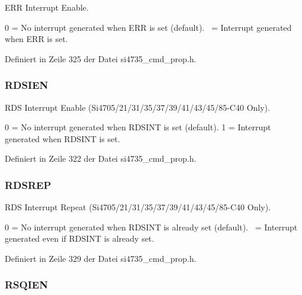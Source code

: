 E\+R\+R Interrupt Enable. 

0 = No interrupt generated when E\+R\+R is set (default).~ = Interrupt generated when E\+R\+R is set. 

Definiert in Zeile 325 der Datei si4735\+\_\+cmd\+\_\+prop.\+h.

\hypertarget{uniongpo__ien_ae79eafa6dcf4c70810372eee4930d5bc}{}
\subsubsection[{R\+D\+S\+I\+E\+N}]{\setlength{\rightskip}{0pt plus 5cm}R\+D\+S\+I\+E\+N}\label{uniongpo__ien_ae79eafa6dcf4c70810372eee4930d5bc}


R\+D\+S Interrupt Enable (Si4705/21/31/35/37/39/41/43/45/85-\/\+C40 Only). 

0 = No interrupt generated when R\+D\+S\+I\+N\+T is set (default). 1 = Interrupt generated when R\+D\+S\+I\+N\+T is set. 

Definiert in Zeile 322 der Datei si4735\+\_\+cmd\+\_\+prop.\+h.

\hypertarget{uniongpo__ien_ab3e7ebd5f6d308aa08db65fae6cd5ebe}{}
\subsubsection[{R\+D\+S\+R\+E\+P}]{\setlength{\rightskip}{0pt plus 5cm}R\+D\+S\+R\+E\+P}\label{uniongpo__ien_ab3e7ebd5f6d308aa08db65fae6cd5ebe}


R\+D\+S Interrupt Repeat (Si4705/21/31/35/37/39/41/43/45/85-\/\+C40 Only). 

0 = No interrupt generated when R\+D\+S\+I\+N\+T is already set (default).~ = Interrupt generated even if R\+D\+S\+I\+N\+T is already set. 

Definiert in Zeile 329 der Datei si4735\+\_\+cmd\+\_\+prop.\+h.

\hypertarget{uniongpo__ien_a3f5edb9c295e1e92b34232c9f3a6cfa1}{}
\subsubsection[{R\+S\+Q\+I\+E\+N}]{\setlength{\rightskip}{0pt plus 5cm}R\+S\+Q\+I\+E\+N}\label{uniongpo__ien_a3f5edb9c295e1e92b34232c9f3a6cfa1}


